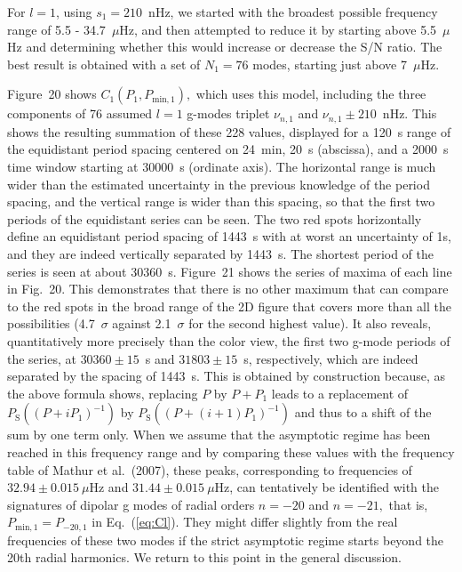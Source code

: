 \documentclass[bibyear]{aa}
\begin{document}
For $l=1$, using $s_1=210$~nHz, we started with the broadest possible 
frequency range of 5.5 - 34.7~$\mu$Hz, and then attempted to reduce it 
by starting above 5.5~$\mu$Hz and determining whether this would  increase or 
decrease the  S/N ratio. The best result is obtained with a set of $N_1=76$ modes, 
starting just above 7~$\mu$Hz.

Figure~20 shows $C_1(P_1,P_{\mathrm{min},1}),$ which uses this model, including the three components of 76 assumed $l=1$ g-modes   
triplet $\nu_{n,1}$ and $\nu_{n,1} \pm 210$~nHz.
This shows the resulting summation of these 228 values, displayed for a 120~s range of the equidistant period spacing centered on 24~min, 20~s (abscissa), and a 2000~s time window starting at 30000~s (ordinate axis). The horizontal range is much wider than the estimated uncertainty in the previous knowledge of the period spacing, and the vertical range is wider than this spacing, so that the first two periods of the equidistant series can be seen. The two red spots horizontally define an equidistant period spacing of 1443~s with at worst an uncertainty of 1s, and they are indeed vertically separated by 1443~s. The shortest period of the series is seen at about 30360~s. Figure~21 shows the series of maxima of each line in Fig.~20. This demonstrates that there is no other maximum that can compare to the red spots in the broad range of the 2D figure that covers more than all the possibilities (4.7~$\sigma$ against 2.1~$\sigma$ for the second highest value). It also reveals, quantitatively more precisely than the color view, the first two g-mode periods of the series, at $30360\pm 15$~s and $31803\pm15$~s, respectively, which are indeed separated by the spacing of 1443~s. This is obtained by construction because, as the above formula shows, replacing $P$ by $P+P_1$ leads to a replacement of $P_\mathrm{S}((P + i P_1)^{-1})$ by $P_\mathrm{S}((P + (i+1) P_1)^{-1})$ and thus to a shift of the sum by one term only.   When we assume that the asymptotic regime has been reached in this frequency range and by comparing these values with the frequency table of Mathur et al.~(2007), these peaks, corresponding to frequencies of  $32.94\pm 0.015\ \mu$Hz and  $31.44\pm 0.015\ \mu$Hz, can tentatively be identified with the signatures of dipolar g modes of radial orders $n=-20$ and $n=-21,$ that is, $P_{\mathrm{min},1}=P_{-20,1}$ in Eq.~(\ref{eq:Cl}). They might differ slightly from the real frequencies of these two modes if the strict asymptotic regime starts beyond the 20th radial harmonics. We return to this point in the general discussion.
\end{document}
